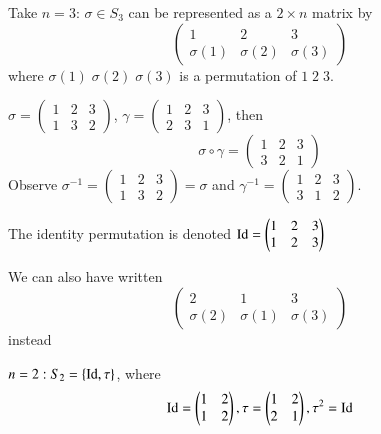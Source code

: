 \documentclass[12pt, a4paper, oneside, openright, titlepage]{book}
\begin{document}
\begin{eg}
    Take $n = 3$: $\sigma \in S_3$ can be represented as a $2\times n$ matrix by $$\begin{pmatrix} 1 & 2 & 3 \\ \sigma(1) & \sigma(2) & \sigma(3) \end{pmatrix}$$ where $\sigma(1)\;\sigma(2)\;\sigma(3)$ is a permutation of $1\;2\;3$.
    \begin{eg}
        $\sigma = \begin{pmatrix} 1 & 2 & 3 \\ 1 & 3 & 2 \end{pmatrix}$, $\gamma = \begin{pmatrix} 1 & 2 & 3 \\ 2 & 3 & 1 \end{pmatrix}$, then $$\sigma \circ \gamma = \begin{pmatrix} 1 & 2 & 3 \\ 3 & 2 & 1 \end{pmatrix}$$
        Observe $\sigma^{-1} = \begin{pmatrix} 1 & 2 & 3 \\ 1 & 3 & 2 \end{pmatrix} = \sigma$ and $\gamma^{-1} = \begin{pmatrix} 1 & 2 & 3 \\ 3 & 1 & 2 \end{pmatrix}$. 
    \end{eg}
    The identity permutation is denoted $\operatorname{Id} = \begin{pmatrix} 1 & 2 & 3 \\ 1 & 2 & 3 \end{pmatrix}$
    \begin{note}
        We can also have written $$\begin{pmatrix} 2 & 1 & 3 \\ \sigma(2) & \sigma(1) & \sigma(3) \end{pmatrix}$$
        instead
    \end{note}
\end{eg}

\begin{eg}
    $n=2: S_2 = \{\operatorname{Id}, \tau\}$, where $$\operatorname{Id} = \begin{pmatrix} 1 & 2  \\ 1 & 2  \end{pmatrix}, \tau = \begin{pmatrix} 1 & 2 \\ 2 & 1 \end{pmatrix}, \tau^2 = \operatorname{Id}$$
\end{eg}
\end{document}
